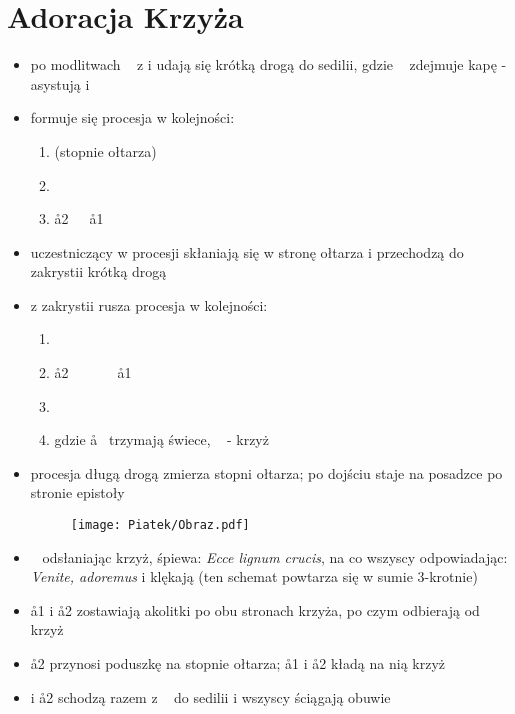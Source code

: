 \section{Adoracja Krzyża}

\begin{itemize}
    \item po modlitwach \ii~ z  i  udają się krótką drogą do sedilii,
          gdzie \ii~ zdejmuje kapę - asystują  i 
    \item formuje się procesja w kolejności:

          \begin{enumerate}\centering
              \item[] (stopnie ołtarza)
              \item[] ~~~\ii~~~~
              \item[] \aa2~~~\aa1
          \end{enumerate}

    \item uczestniczący w procesji skłaniają się w stronę ołtarza i przechodzą
          do zakrystii krótką drogą

    \item z zakrystii rusza procesja w kolejności:

          \begin{enumerate}\centering
              \item[] ~~~
              \item[] \aa2~~~\ii~~~~\aa1
              \item[]
              \item[] gdzie \aa~ trzymają świece, \ii~ - krzyż
          \end{enumerate}

    \item procesja długą drogą zmierza stopni ołtarza; po dojściu staje na
          posadzce po stronie epistoły

          \begin{figure}[h]
              \centering
              \texttt{[image: Piatek/Obraz.pdf]}
          \end{figure}

    \item \ii~ odsłaniając krzyż, śpiewa: \textit{Ecce lignum crucis}, na co
          wszyscy odpowiadając: \textit{Venite, adoremus} i klękają (ten schemat
          powtarza się w sumie 3-krotnie)
    \item \aa1 i \aa2 zostawiają akolitki po obu stronach krzyża, po czym
          odbierają od \ii~ krzyż
    \item \aa2 przynosi poduszkę na stopnie ołtarza; \aa1 i \aa2 kładą na nią
          krzyż
    \item {} i \aa2 schodzą razem z \ii~ do sedilii i wszyscy ściągają obuwie


\end{itemize}

